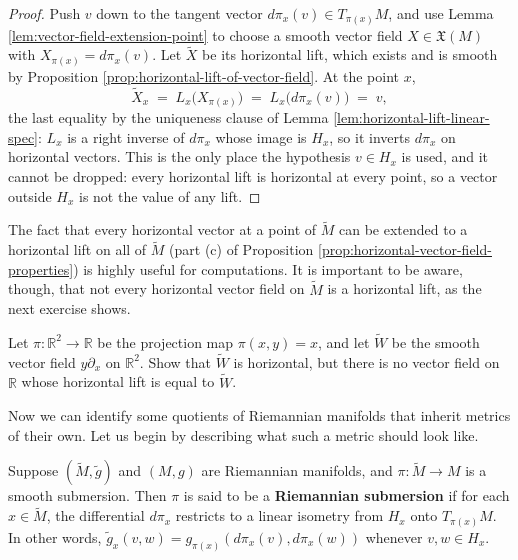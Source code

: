 \begin{proof}
\leanok
Push $v$ down to the tangent vector $d\pi_x(v) \in T_{\pi(x)}M$, and use Lemma \ref{lem:vector-field-extension-point} to choose a smooth vector field $X \in \mathfrak{X}(M)$ with $X_{\pi(x)} = d\pi_x(v)$. Let $\tilde{X}$ be its horizontal lift, which exists and is smooth by Proposition \ref{prop:horizontal-lift-of-vector-field}. At the point $x$,
\[
\tilde{X}_x \;=\; L_x\bigl(X_{\pi(x)}\bigr) \;=\; L_x\bigl(d\pi_x(v)\bigr) \;=\; v,
\]
the last equality by the uniqueness clause of Lemma \ref{lem:horizontal-lift-linear-spec}: $L_x$ is a right inverse of $d\pi_x$ whose image is $H_x$, so it inverts $d\pi_x$ on horizontal vectors. This is the only place the hypothesis $v \in H_x$ is used, and it cannot be dropped: every horizontal lift is horizontal at every point, so a vector outside $H_x$ is not the value of any lift.
\end{proof}

The fact that every horizontal vector at a point of $\tilde{M}$ can be extended to a horizontal lift on all of $\tilde{M}$ (part (c) of Proposition \ref{prop:horizontal-vector-field-properties}) is highly useful for computations. It is important to be aware, though, that not every horizontal vector field on $\tilde{M}$ is a horizontal lift, as the next exercise shows.

\begin{exercise}
\label{exer:horizontal-vector-field-not-lift}
\leanok
{}
Let $\pi: \mathbb{R}^2 \to \mathbb{R}$ be the projection map $\pi(x,y) = x$, and let $\tilde{W}$ be the smooth vector field $y\partial_x$ on $\mathbb{R}^2$. Show that $\tilde{W}$ is horizontal, but there is no vector field on $\mathbb{R}$ whose horizontal lift is equal to $\tilde{W}$.
\end{exercise}

Now we can identify some quotients of Riemannian manifolds that inherit metrics of their own. Let us begin by describing what such a metric should look like.

Suppose $(\tilde{M},\tilde{g})$ and $(M,g)$ are Riemannian manifolds, and $\pi: \tilde{M} \to M$ is a smooth submersion. Then $\pi$ is said to be a \textbf{Riemannian submersion} if for each $x \in \tilde{M}$, the differential $d\pi_x$ restricts to a linear isometry from $H_x$ onto $T_{\pi(x)}M$. In other words, $\tilde{g}_x(v,w) = g_{\pi(x)}(d\pi_x(v), d\pi_x(w))$ whenever $v,w \in H_x$.

